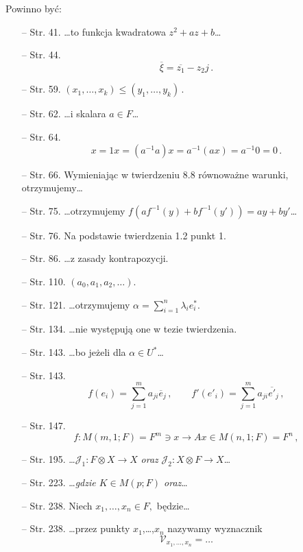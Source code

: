 \documentclass[a4paper,11pt]{article}
\begin{document}
\vspace{\spaceTwo}


Powinno być:
\begin{itemize}
\item[--] Str. 41. \ldots to funkcja kwadratowa $z^2+az+b$\ldots
\item[--] Str. 44.
  $$\overline{ \xi } = \overline{ z_{ 1 } } - z_{ 2 } j \, .$$
\item[--] Str. 59.
  $( x_{ 1 }, \ldots, x_{ k } ) \leq (y_{ 1 }, \ldots, y_{ k } ) \, .$
\item[--] Str. 62. \ldots i skalara $a \in F$\ldots
\item[--] Str. 64.
  $$x = 1 x = ( a^{ -1 } a ) x = a^{ -1 }( a x ) = a^{ -1 } 0 = 0 \,
  .$$
\item[--] Str. 66. Wymieniając w twierdzeniu 8.8 równoważne warunki,
  otrzymujemy\ldots
\item[--] Str. 75. \ldots otrzymujemy
  $f( a f^{ -1 }( y ) + b f^{ -1 } ( y' ) ) = a y + b y'$\ldots
\item[--] Str. 76. Na podstawie twierdzenia 1.2 punkt 1.
\item[--] Str. 86. \ldots z zasady kontrapozycji.
\item[--] Str. 110. $( a_{ 0 }, a_{ 1 }, a_{ 2 }, \ldots )$.
\item[--] Str. 121. \ldots otrzymujemy
  $\alpha = \sum_{ i = 1 }^{ n } \lambda_{ i } e^{ * }_{ i } .$
\item[--] Str. 134. \ldots nie występują one w tezie twierdzenia.
\item[--] Str. 143. \ldots bo jeżeli dla $\alpha \in U^{ * }$\ldots
\item[--] Str. 143.
  $$f( e_{ i } ) = \sum_{ j = 1 }^{ m } a_{ j i } \overline{ { e } }_{
    j } \, , \qquad f'( e'_{ i } ) = \sum_{ j = 1 }^{ m } a_{ j i }
  \overline{ { e }' }_{ j } \, ,$$
\item[--] Str. 147.
  $$f : M( m, 1; F ) = F^{ m } \ni x \longrightarrow A x \in M( n, 1 ;
  F ) = F^{ n } \, ,$$
\item[--] Str. 195.
  \ldots$\mathcal{ J }_{ 1 } : F \otimes X \rightarrow X$ \emph{oraz}
  $\mathcal{ J }_{ 2 } : X \otimes F \rightarrow X$\ldots
\item[--] Str. 223. \ldots\emph{gdzie $K \in M( p; F )$ oraz}\ldots
\item[--] Str. 238. Niech $x_{ 1 }, \ldots, x_{ n } \in F ,$
  będzie\ldots
\item[--] Str. 238. \ldots przez punkty $x_{ 1 }$,\ldots,$x_{ n }$
  nazywamy wyznacznik
$$\mathcal{ V }_{ x_{ 1 }, \ldots, x_{ n } } = \ldots$$

\end{itemize}
\end{document}
